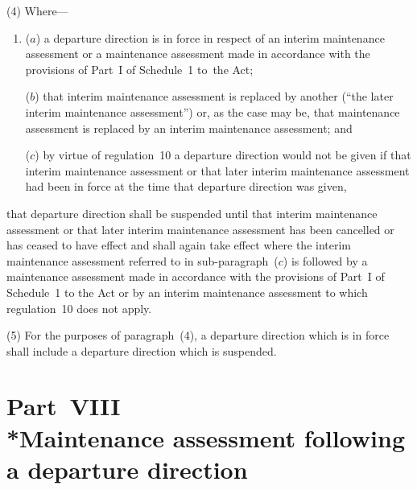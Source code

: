 \documentclass[12pt,a4paper]{article}
\begin{document}
(4) Where—
\begin{enumerate}\item[]
($a$) a departure direction is in force in respect of an interim maintenance
assessment or a maintenance assessment made in accordance with the provisions of
Part~I of Schedule~1 to~the Act;

($b$) that interim maintenance assessment is replaced by another (“the later
interim maintenance assessment”) or, as the case may be, that maintenance
assessment is replaced by an interim maintenance assessment; and

($c$) by virtue of regulation~10 a departure direction would not be given if that
interim maintenance assessment or that later interim maintenance assessment had
been in force at the time that departure direction was given, 
\end{enumerate}
that departure direction shall be suspended until that interim maintenance assessment or that later interim maintenance assessment has been cancelled or has ceased to have effect and shall again take effect 
where the interim maintenance assessment referred to in sub-paragraph~($c$) is followed by a maintenance assessment made in accordance with the provisions of Part~I of Schedule~1 to the Act or by an interim maintenance assessment to which regulation~10 does not apply.  %

(5) For the purposes of paragraph~(4), a departure direction which is in force
shall include a departure direction which is suspended.


\section[Part~VIII --- Maintenance assessment following a departure direction]{\sloppy Part~VIII\\*Maintenance assessment following a departure direction}

\renewcommand\parthead{--- Part~VIII}
\end{document}
